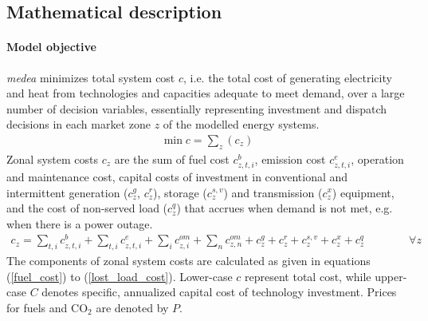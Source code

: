 \documentclass[review, 3p, times]{elsarticle} %
\newcommand{\COO}{\ensuremath{\mathrm{CO_2}} }
\begin{document}
    \newpage

    \subsection{Mathematical description} \label{mathmodel}

    \paragraph{Model objective}
    \emph{medea} minimizes total system cost $c$, i.e. the total cost of generating electricity and heat from technologies and capacities adequate to meet demand, over a large number of decision variables, essentially representing investment and dispatch decisions in each market zone $z$ of the modelled energy systems.
    \begin{align}
        \min c = \sum_{z} (c_{z})
    \end{align}
    Zonal system costs $c_{z}$ are the sum of fuel cost $c^{b}_{z,t,i}$, emission cost $c^{e}_{z,t,i}$, operation and maintenance cost, capital costs of investment in conventional and intermittent generation ($c^{g}_{z}$, $c^{r}_{z}$), storage ($c^{s,v}_{z}$) and transmission ($c^{x}_{z}$) equipment, and the cost of non-served load ($c^{q}_{z}$) that accrues when demand is not met, e.g. when there is a power outage.
    \begin{align}
        c_{z} = \sum_{t,i}  c^{b}_{z,t,i} + \sum_{t,i} c^{e}_{z,t,i} + \sum_{i} c^{om}_{z,i} + \sum_{n} c^{om}_{z,n} + c^{g}_{z} +
        c^{r}_{z} + c^{s,v}_{z} + c^{x}_{z} + c^{q}_{z} \qquad \qquad \forall z
    \end{align}
    The components of zonal system costs are calculated as given in equations (\ref{fuel_cost}) to (\ref{lost_load_cost}).
    Lower-case $c$ represent total cost, while upper-case $C$ denotes specific, annualized capital cost of technology investment.
    Prices for fuels and \COO are denoted by $P$.
\end{document}
